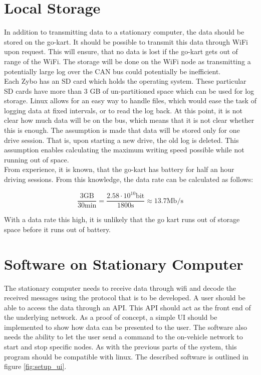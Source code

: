 
\section{Local Storage}
In addition to transmitting data to a stationary computer, the data should be stored on the go-kart.
It should be possible to transmit this data through WiFi upon request.
This will ensure, that no data is lost if the go-kart gets out of range of the WiFi.
The storage will be done on the WiFi node as transmitting a potentially large log over the CAN bus could potentially be inefficient.\\

Each Zybo has an SD card which holds the operating system.
These particular SD cards have more than 3 GB of un-partitioned space which can be used for log storage. 
Linux allows for an easy way to handle files, which would ease the task of logging data at fixed intervals, or to read the log back.
At this point, it is not clear how much data will be on the bus, which means that it is not clear whether this is enough.
The assumption is made that data will be stored only for one drive session.
That is, upon starting a new drive, the old log is deleted.
This assumption enables calculating the maximum writing speed possible while not running out of space.\\

From experience, it is known, that the go-kart has battery for half an hour driving sessions.
From this knowledge, the data rate can be calculated as follows:

\begin{equation}
	\frac{3\mathrm{GB}}{30\si{\minute}} = \frac{2.58 \cdot 10^{10} \mathrm{bit}}{1800 \si{\second}} \approx 13.7 \mathrm{Mb/s}
\end{equation}

With a data rate this high, it is unlikely that the go kart runs out of storage space before it runs out of battery.

\section{Software on Stationary Computer}
The stationary computer needs to receive data through wifi and decode the received messages using the protocol that is to be developed.
A user should be able to access the data through an API.
This API should act as the front end of the underlying network.
As a proof of concept, a simple UI should be implemented to show how data can be presented to the user.
The software also needs the ability to let the user send a command to the on-vehicle network to start and stop specific nodes.
As with the previous parts of the system, this program should be compatible with linux.
The described software is outlined in figure \ref{fig:setup_ui}.

